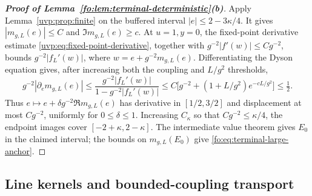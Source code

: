 \documentclass[11pt]{article}
\numberwithin{equation}{section}
\theoremstyle{remark}
\begin{document}
\begin{proof}[\textbf{Proof of Lemma~\ref{fo:lem:terminal-deterministic}(b)}]
Apply Lemma~\ref{uvp:prop:finite} on the buffered
interval $|e|\le2-3\kappa/4$. It gives $|m_{g,L}(e)|\le C$ and
$\Im m_{g,L}(e)\ge c$. At $u=1,y=0$, the fixed-point derivative
estimate \eqref{uvp:eq:fixed-point-derivative}, together with
$g^{-2}|f'(w)|\le Cg^{-2}$, bounds $g^{-2}|f_L'(w)|$, where
$w=e+g^{-2}m_{g,L}(e)$. Differentiating the Dyson equation gives,
after increasing both the coupling and $L/g^2$ thresholds,
\begin{equation}\label{fo:eq:terminal-anchor-derivative}
 g^{-2}|\partial_e m_{g,L}(e)|
 \le \frac{g^{-2}|f_L'(w)|}{1-g^{-2}|f_L'(w)|}
 \le C\bigl[g^{-2}+(1+L/g^2)e^{-cL/g^2}\bigr]\le\tfrac12.
\end{equation}
Thus $e\mapsto e+\delta g^{-2}\Re m_{g,L}(e)$ has derivative in
$[1/2,3/2]$ and displacement at most $Cg^{-2}$, uniformly for
$0\le\delta\le1$. Increasing $C_\kappa$ so that $Cg^{-2}\le\kappa/4$,
the endpoint images cover $[-2+\kappa,2-\kappa]$.
The intermediate value theorem gives $E_0$ in the claimed interval;
the bounds on $m_{g,L}(E_0)$ give \eqref{fo:eq:terminal-large-anchor}.
\end{proof}

\subsection{Line kernels and bounded-coupling transport}
\label{app:line-transport}
\end{document}
